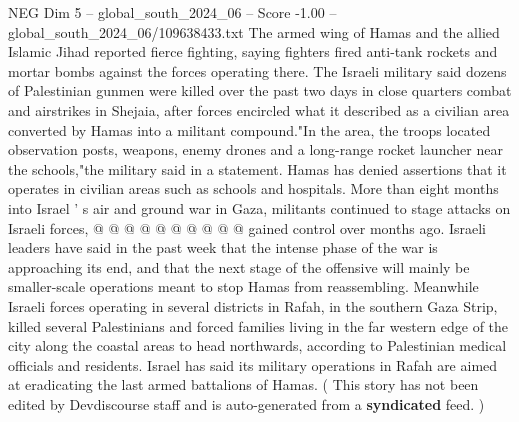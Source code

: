 \begin{textsample}{NEG Dim 5 – global\_south\_2024\_06 – Score -1.00 – global\_south\_2024\_06/109638433.txt}
The armed wing of Hamas and the allied Islamic Jihad reported fierce fighting, saying fighters fired anti-tank rockets and mortar bombs against the forces operating there.
The Israeli military said dozens of Palestinian gunmen were killed over the past two days in close quarters combat and airstrikes in Shejaia, after forces encircled what it described as a civilian area converted by Hamas into a militant compound."In the area, the troops located observation posts, weapons, enemy drones and a long-range rocket launcher near the schools,"the military said in a statement.
Hamas has denied assertions that it operates in civilian areas such as schools and hospitals.
More than eight months into Israel ' s air and ground war in Gaza, militants continued to stage attacks on Israeli forces, @ @ @ @ @ @ @ @ @ @ gained control over months ago.
Israeli leaders have said in the past week that the intense phase of the war is approaching its end, and that the next stage of the offensive will mainly be smaller-scale operations meant to stop Hamas from reassembling.
Meanwhile Israeli forces operating in several districts in Rafah, in the southern Gaza Strip, killed several Palestinians and forced families living in the far western edge of the city along the coastal areas to head northwards, according to Palestinian medical officials and residents.
Israel has said its military operations in Rafah are aimed at eradicating the last armed battalions of Hamas. ( This story has not been edited by Devdiscourse staff and is auto-generated from a \textbf{syndicated} feed. )

\end{textsample}
